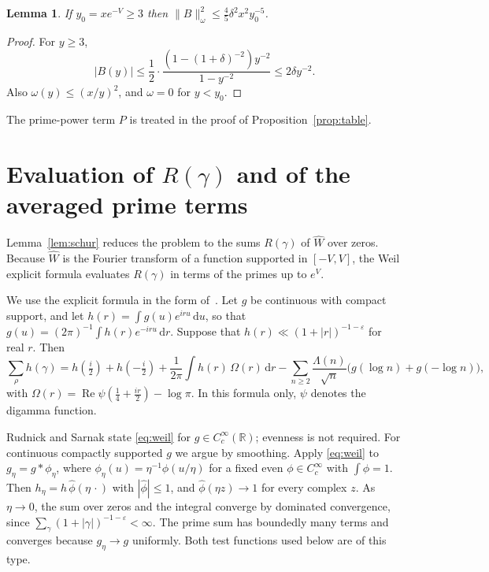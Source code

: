 \documentclass[11pt]{amsart}
\newtheorem{lemma}[theorem]{Lemma}
\theoremstyle{remark}
\newcommand{\dd}{\,\mathrm{d}}
\newcommand{\re}{\operatorname{Re}}
\newcommand{\Wh}{\widehat W}
\begin{document}
\begin{lemma}\label{lem:BP}
If $y_0=xe^{-V}\ge3$ then $\|B\|_\omega^2\le\frac45\delta^2x^2y_0^{-5}$.
\end{lemma}
\begin{proof}
For $y\ge3$,
\[
|B(y)|\le\frac12\cdot\frac{(1-(1+\delta)^{-2})y^{-2}}{1-y^{-2}}\le2\delta y^{-2}.
\]
Also $\omega(y)\le(x/y)^2$, and $\omega=0$ for $y<y_0$.
\end{proof}

The prime-power term $P$ is treated in the proof of Proposition~\ref{prop:table}.

\section{Evaluation of $R(\gamma)$ and of the averaged prime terms}\label{sec:weil}

Lemma~\ref{lem:schur} reduces the problem to the sums $R(\gamma)$ of $\Wh$ over zeros. Because $\Wh$ is the Fourier transform of a function supported in $[-V,V]$, the Weil explicit formula evaluates $R(\gamma)$ in terms of the primes up to $e^V$.

We use the explicit formula in the form of~\cite[Prop.~2.1]{RS}. Let $g$ be continuous with compact support, and let $h(r)=\int g(u)e^{iru}\dd u$, so that $g(u)=(2\pi)^{-1}\int h(r)e^{-iru}\dd r$. Suppose that $h(r)\ll(1+|r|)^{-1-\varepsilon}$ for real $r$. Then
\begin{equation}\label{eq:weil}
\sum_\rho h(\gamma)=h(\tfrac i2)+h(-\tfrac i2)+\frac1{2\pi}\int h(r)\,\Omega(r)\dd r-\sum_{n\ge2}\frac{\Lambda(n)}{\sqrt n}\big(g(\log n)+g(-\log n)\big),
\end{equation}
with $\Omega(r)=\re\psi(\frac14+\frac{ir}2)-\log\pi$. In this formula only, $\psi$ denotes the digamma function.

Rudnick and Sarnak state \eqref{eq:weil} for $g\in C_c^\infty(\mathbb R)$; evenness is not required. For continuous compactly supported $g$ we argue by smoothing. Apply \eqref{eq:weil} to $g_\eta=g*\phi_\eta$, where $\phi_\eta(u)=\eta^{-1}\phi(u/\eta)$ for a fixed even $\phi\in C_c^\infty$ with $\int\phi=1$. Then $h_\eta=h\,\widehat\phi(\eta\,\cdot)$ with $|\widehat\phi|\le1$, and $\widehat\phi(\eta z)\to1$ for every complex $z$. As $\eta\to0$, the sum over zeros and the integral converge by dominated convergence, since $\sum_\gamma(1+|\gamma|)^{-1-\varepsilon}<\infty$. The prime sum has boundedly many terms and converges because $g_\eta\to g$ uniformly. Both test functions used below are of this type.
\end{document}
